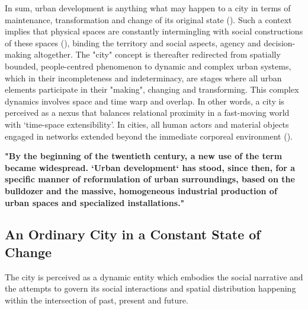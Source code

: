 \documentclass[11pt]{report}
\begin{document}
In sum, urban development is anything what may happen to a city in terms of maintenance, transformation and change of its original state (\href{Friedmann}{\citealt{friedmann_planning_1987}}).
Such a context implies that physical spaces are constantly intermingling with social constructions of these spaces (\href{Firmino}{\citealt{firmino_pervasive_2008}}), binding the territory and social aspects, agency and decision-making altogether.
The "city" concept is thereafter redirected from spatially bounded, people-centred phenomenon to dynamic and complex urban systems, which in their incompleteness and indeterminacy, are stages where all urban elements participate in their "making", changing and transforming.
This complex dynamics involves space and time warp and overlap.
In other words, a city is perceived as a nexus that balances relational proximity in a fast-moving world with ‘time-space extensibility’.
In cities, all human actors and material objects engaged in networks extended beyond the immediate corporeal environment (\href{Graham}{\citealt{graham_splintering_2001}}).  

\textbf{"By the beginning of the twentieth century, a new use of the term became widespread. ‘Urban development‘ has stood, since then, for a specific manner of reformulation of urban surroundings, based on the bulldozer and the massive, homogeneous industrial production of urban spaces and specialized installations." \href{Esteva}{\citealt{esteva_development_2010 2001}}}

\subsection{An Ordinary City in a Constant State of Change}

The city is perceived as a dynamic entity which embodies the social narrative and the attempts to govern its social interactions and spatial distribution happening within the intersection of past, present and future.
\\
\end{document}
